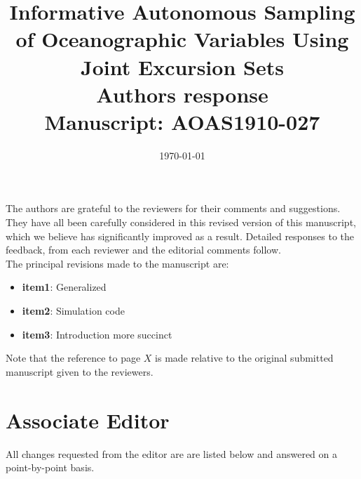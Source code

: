 \documentclass[a4paper]{article}
\newcounter{reviewer}
\begin{document}
\title{Informative Autonomous Sampling of Oceanographic Variables Using Joint Excursion Sets
  \\\vspace{5mm}
 Authors response
  \\\vspace{5mm}
\small{Manuscript: AOAS1910-027}}
\author{ }

\date{\today}

\maketitle

The authors are grateful to the reviewers for their comments and
suggestions. They have all been carefully considered in this revised
version of this manuscript, which we believe has significantly
improved as a result. Detailed responses to the feedback, from each reviewer and the editorial comments follow.\\

The principal revisions made to the manuscript are:
\vspace{0.5cm}

\begin{itemize}[noitemsep, topsep=0pt, parsep=0pt, partopsep=0pt]
\item \textbf{item1}: Generalized
\item \textbf{item2}: Simulation code
\item \textbf{item3}: Introduction more succinct 
\end{itemize}
\par \vspace{1em}

Note that the reference to page $X$ is made relative to
the original submitted manuscript given to the reviewers.

 \section*{Associate Editor}
All changes requested from the editor are are listed below and answered on a point-by-point basis.

\setcounter{reviewer}{1}
\end{document}
